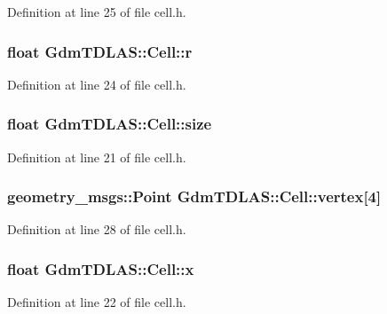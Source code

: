 Definition at line 25 of file cell.h.

\subsubsection[{r}]{\setlength{\rightskip}{0pt plus 5cm}float {\bf GdmTDLAS::Cell::r}\hspace{0.3cm}{\ttfamily  [private]}}\label{classGdmTDLAS_1_1Cell_adbad1b0d3d8d4cc5d635dd5369ad1cb0}


Definition at line 24 of file cell.h.

\subsubsection[{size}]{\setlength{\rightskip}{0pt plus 5cm}float {\bf GdmTDLAS::Cell::size}\hspace{0.3cm}{\ttfamily  [private]}}\label{classGdmTDLAS_1_1Cell_aa830b04bef76ced51b6d0333e3d395b5}


Definition at line 21 of file cell.h.

\subsubsection[{vertex}]{\setlength{\rightskip}{0pt plus 5cm}geometry\_\-msgs::Point {\bf GdmTDLAS::Cell::vertex}[4]\hspace{0.3cm}{\ttfamily  [private]}}\label{classGdmTDLAS_1_1Cell_acaed9a4f38691b7fb5905193adb56985}


Definition at line 28 of file cell.h.

\subsubsection[{x}]{\setlength{\rightskip}{0pt plus 5cm}float {\bf GdmTDLAS::Cell::x}\hspace{0.3cm}{\ttfamily  [private]}}\label{classGdmTDLAS_1_1Cell_a89be096c43989a37b66debd709446bae}


Definition at line 22 of file cell.h.

